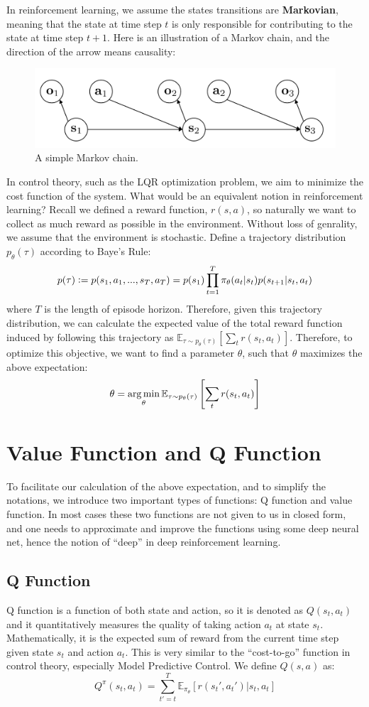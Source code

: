 In reinforcement learning, we assume the states transitions are \textbf{Markovian}, meaning that the state at time step $t$ is only responsible for contributing to the state at time step $t+1$.
Here is an illustration of a Markov chain, and the direction of the arrow means causality:
\begin{figure}
    \centering
    \includegraphics[scale = 0.4]{figures/markov.png}
    \caption{A simple Markov chain.}
    \label{fig:markov}
\end{figure}

In control theory, such as the LQR optimization problem, we aim to minimize the cost function of the system. What would be an equivalent notion in reinforcement learning? Recall we defined a reward function, $r(s,a)$, so naturally we want to collect as much reward as possible in the environment. Without loss of genrality, we assume that the environment is stochastic. Define a trajectory distribution $p_\theta(\tau)$ according to Baye's Rule:
$$ p(\tau) \vcentcolon= p(s_1,a_1,...,s_T,a_T) = p(s_1)\prod_{t=1}^T\pi_\theta(a_t|s_t)p(s_{t+1}|s_t,a_t)$$
where $T$ is the length of episode horizon. Therefore, given this trajectory distribution, we can calculate the expected value of the total reward function induced by following this trajectory as $\mathbb{E}_{\tau\sim p_\theta(\tau)}\left[\sum_t r(s_t,a_t)\right]$. Therefore, to optimize this objective, we want to find a parameter $\theta$, such that $\theta$ maximizes the above expectation:
$$\theta = \operatorname*{arg\,min}_\theta\mathbb{E}_{\tau\sim p_\theta(\tau)}\left[\sum_t r(s_t,a_t)\right]$$
\section{Value Function and Q Function}
To facilitate our calculation of the above expectation, and to simplify the notations, we introduce two important types of functions: Q function and value function. In most cases these two functions are not given to us in closed form, and one needs to approximate and improve the functions using some deep neural net, hence the notion of ``deep'' in deep reinforcement learning.
\subsection{Q Function}
Q function is a function of both state and action, so it is denoted as $Q(s_t,a_t)$ and it quantitatively measures the quality of taking action $a_t$ at state $s_t$. Mathematically, it is the expected sum of reward from the current time step given state $s_t$ and action $a_t$. This is very similar to the ``cost-to-go'' function in control theory, especially Model Predictive Control. We define $Q(s,a)$ as:
$$Q^\pi(s_t,a_t) = \sum_{t'=t}^T{\mathbb{E}_{\pi_\theta}[r(s_t',a_t')|s_t,a_t]}$$
